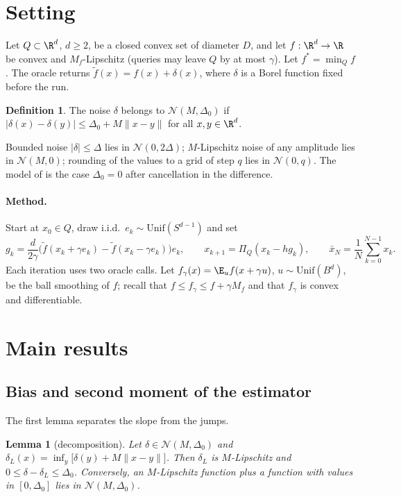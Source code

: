 \documentclass{article} %
\newcommand{\cN}{\mathcal{N}}
\newcommand{\Prj}{\Pi_Q}
\newcommand{\unif}{\mathrm{Unif}}
\newcommand{\norm}[1]{\lVert #1\rVert}
\theoremstyle{plain}
\newtheorem{lemma}{Lemma}
\theoremstyle{definition}
\newtheorem{definition}{Definition}
\theoremstyle{remark}
\begin{document}
\section{Setting}\label{sec:setup}

Let $Q\subset\R^d$, $d\ge2$, be a closed convex set of diameter $D$, and let $f:\R^d\to\R$ be convex and $M_f$-Lipschitz (queries may leave $Q$ by at most $\gamma$). Let $f^*=\min_Qf$. The oracle returns $\tilde f(x)=f(x)+\delta(x)$, where $\delta$ is a Borel function fixed before the run.

\begin{definition}\label{def:class}
The noise $\delta$ belongs to $\cN(M,\Delta_0)$ if $|\delta(x)-\delta(y)|\le\Delta_0+M\norm{x-y}$ for all $x,y\in\R^d$.
\end{definition}

Bounded noise $|\delta|\le\Delta$ lies in $\cN(0,2\Delta)$; $M$-Lipschitz noise of any amplitude lies in $\cN(M,0)$; rounding of the values to a grid of step $q$ lies in $\cN(0,q)$. The model of \citet{gasnikov2016inexact} is the case $\Delta_0=0$ after cancellation in the difference.

\paragraph{Method.} Start at $x_0\in Q$, draw i.i.d.\ $e_k\sim\unif(S^{d-1})$ and set
\begin{equation}\label{eq:method}
  g_k=\frac{d}{2\gamma}\bigl(\tilde f(x_k+\gamma e_k)-\tilde f(x_k-\gamma e_k)\bigr)e_k,\qquad x_{k+1}=\Prj(x_k-hg_k),\qquad \bar x_N=\frac1N\sum_{k=0}^{N-1}x_k .
\end{equation}
Each iteration uses two oracle calls. Let $f_\gamma(x)=\E_uf(x+\gamma u)$, $u\sim\unif(B^d)$, be the ball smoothing of $f$; recall that $f\le f_\gamma\le f+\gamma M_f$ and that $f_\gamma$ is convex and differentiable.

\section{Main results}\label{sec:results}

\subsection{Bias and second moment of the estimator}

The first lemma separates the slope from the jumps.

\begin{lemma}[decomposition]\label{lem:decomp}
Let $\delta\in\cN(M,\Delta_0)$ and $\delta_L(x)=\inf_y\bigl[\delta(y)+M\norm{x-y}\bigr]$. Then $\delta_L$ is $M$-Lipschitz and $0\le\delta-\delta_L\le\Delta_0$. Conversely, an $M$-Lipschitz function plus a function with values in $[0,\Delta_0]$ lies in $\cN(M,\Delta_0)$.
\end{lemma}
\end{document}
